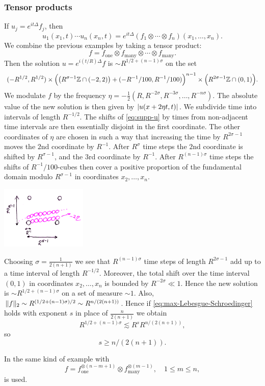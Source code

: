 \subsubsection{Tensor products}
If $u_{j} = e^{it\Delta} f_{j}$, then
\[
u_{1}(x_{1},t) \dotsm u_{n}(x_{n},t)
=
e^{it\Delta} (f_{1}\otimes\dotsm\otimes f_{n})(x_{1},\dotsc,x_{n}).
\]
We combine the previous examples by taking a tensor product:
\[
f = f_{\mathrm{one}} \otimes f_{\mathrm{many}} \otimes \dotsm \otimes f_{\mathrm{many}}.
\]
Then the solution $u = e^{i(t/R)\Delta} f$ is $\sim R^{1/2 + (n-1)\sigma}$ on the set
\begin{equation}
\label{eq:supp-u}
(-R^{1/2},R^{1/2}) \times \Bigl( \bigl( R^{\sigma-1}\mathbb{Z} \cap (-2,2) \bigr) + (-R^{-1}/100,R^{-1}/100) \Bigr)^{n-1} \times \Bigl( R^{2\sigma-1}\mathbb{Z} \cap (0,1) \Bigr).
\end{equation}
We modulate $f$ by the frequency $\eta = -\frac12 (R, R^{-2\sigma}, R^{-3\sigma},\dotsc, R^{-n\sigma})$.
The absolute value of the new solution is then given by $\lvert u(x+2\eta t, t)\rvert$.
We subdivide time into intervals of length $R^{-1/2}$.
The shifts of \eqref{eq:supp-u} by times from non-adjacent time intervals are then essentially disjoint in the first coordinate.
The other coordinates of $\eta$ are chosen in such a way that increasing the time by $R^{2\sigma-1}$ moves the $2$nd coordinate by $R^{-1}$.
After $R^{\sigma}$ time steps the $2$nd coordinate is shifted by $R^{\sigma-1}$, and the $3$rd coordinate by $R^{-1}$.
After $R^{(n-1)\sigma}$ time steps the shifts of $R^{-1}/100$-cubes then cover a positive proportion of the fundamental domain modulo $R^{\sigma-1}$ in coordinates $x_{2},\dotsc,x_{n}$.
\begin{center}
\includegraphics[height=3cm]{luca-rogers-example.png}
\end{center}
Choosing $\sigma=\frac{1}{2(n+1)}$ we see that $R^{(n-1)\sigma}$ time steps of length $R^{2\sigma-1}$ add up to a time interval of length $R^{-1/2}$.
Moreover, the total shift over the time interval $(0,1)$ in coordinates $x_{2},\dotsc,x_{n}$ is bounded by $R^{-2\sigma} \ll 1$.
Hence the new solution is $\sim R^{1/2 + (n-1)\sigma}$ on a set of measure $\sim 1$.
Also, $\lVert f\rVert_{2} \sim R^{(1/2+(n-1)\sigma)/2} \sim R^{n/(2(n+1))}$.
Hence if \eqref{eq:max-Lebesgue-Schroedinger} holds with exponent $s$ in place of $\frac{n}{2(n+1)}$ we obtain
\[
R^{1/2 + (n-1)\sigma} \lesssim R^{s} R^{n/(2(n+1))},
\]
so
\[
s \geq n/(2(n+1)).
\]
\begin{remark}
In \cite{arxiv:1902.01430} the same kind of example with
\[
f = f_{\mathrm{one}}^{\otimes (n-m+1)} \otimes f_{\mathrm{many}}^{\otimes (m-1)},
\quad 1 \leq m \leq n,
\]
is used.
\end{remark}
